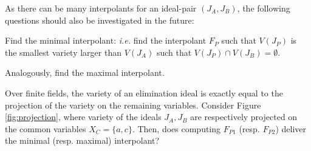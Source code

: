 As there can be many interpolants for an ideal-pair $(J_A, J_B)$, 
the following questions should also be investigated in the future:
\bi
\item Find the minimal interpolant: {\it i.e.} find the interpolant $F_P$
  such that $V(J_P)$ is the smallest variety larger than $V(J_A)$ such
  that $V(J_P) \cap V(J_B) = \emptyset$.
\item Analogously, find the maximal interpolant. 
\item Over finite fields, the variety of an elimination ideal is
  exactly equal to the projection of the variety on the remaining
  variables. Consider Figure \ref{fig:projection}, where variety of the
  ideals $J_A, J_B$ are respectively projected on the common variables
  $X_C = \{a, c\}$. Then, does computing $F_{P1}$ (resp. $F_{P2}$) 
  deliver the minimal (resp. maximal) interpolant?
\ei

\begin{figure}[h]
\end{figure}

% 

